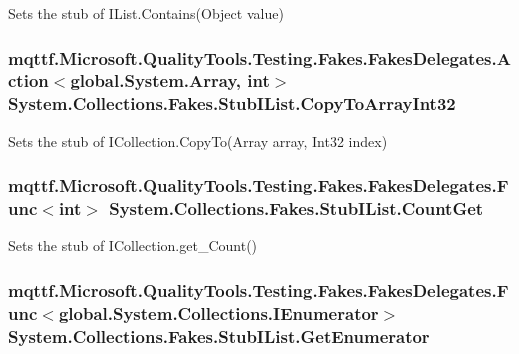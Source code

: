 Sets the stub of I\-List.\-Contains(\-Object value)

\hypertarget{class_system_1_1_collections_1_1_fakes_1_1_stub_i_list_ae5a4a789a76f1fa825c824e4e6f7c60f}{
\subsubsection[{Copy\-To\-Array\-Int32}]{\setlength{\rightskip}{0pt plus 5cm}mqttf.\-Microsoft.\-Quality\-Tools.\-Testing.\-Fakes.\-Fakes\-Delegates.\-Action$<$global.\-System.\-Array, int$>$ System.\-Collections.\-Fakes.\-Stub\-I\-List.\-Copy\-To\-Array\-Int32}}\label{class_system_1_1_collections_1_1_fakes_1_1_stub_i_list_ae5a4a789a76f1fa825c824e4e6f7c60f}


Sets the stub of I\-Collection.\-Copy\-To(\-Array array, Int32 index)

\hypertarget{class_system_1_1_collections_1_1_fakes_1_1_stub_i_list_ab795453a58cf894f7563d83f4aa24f2b}{
\subsubsection[{Count\-Get}]{\setlength{\rightskip}{0pt plus 5cm}mqttf.\-Microsoft.\-Quality\-Tools.\-Testing.\-Fakes.\-Fakes\-Delegates.\-Func$<$int$>$ System.\-Collections.\-Fakes.\-Stub\-I\-List.\-Count\-Get}}\label{class_system_1_1_collections_1_1_fakes_1_1_stub_i_list_ab795453a58cf894f7563d83f4aa24f2b}


Sets the stub of I\-Collection.\-get\-\_\-\-Count()

\hypertarget{class_system_1_1_collections_1_1_fakes_1_1_stub_i_list_acda0187574e4f59e1ec34668cd50c71e}{
\subsubsection[{Get\-Enumerator}]{\setlength{\rightskip}{0pt plus 5cm}mqttf.\-Microsoft.\-Quality\-Tools.\-Testing.\-Fakes.\-Fakes\-Delegates.\-Func$<$global.\-System.\-Collections.\-I\-Enumerator$>$ System.\-Collections.\-Fakes.\-Stub\-I\-List.\-Get\-Enumerator}}\label{class_system_1_1_collections_1_1_fakes_1_1_stub_i_list_acda0187574e4f59e1ec34668cd50c71e}


